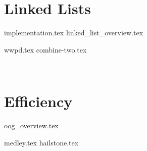 \documentclass{exam}
\begin{document}
\section{Linked Lists}
    {implementation.tex}
    {linked_list_overview.tex}
\begin{questions}
    {wwpd.tex}
    {combine-two.tex}
\end{questions}
​
\section{Efficiency}
{oog_overview.tex}
\begin{questions}
    \newpage
    {medley.tex}
    \newpage
    {hailstone.tex}
\end{questions}
​
\end{document}
